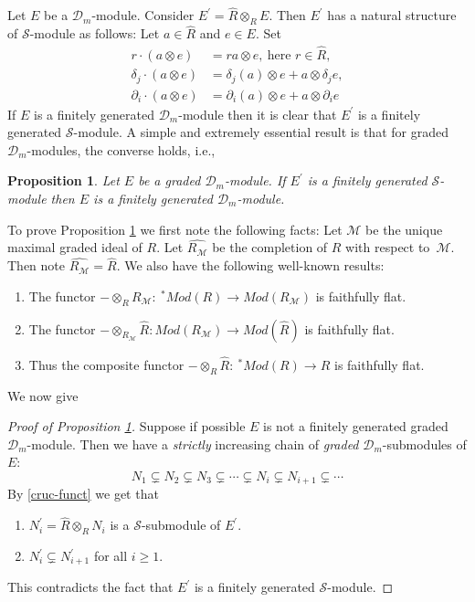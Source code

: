 \documentclass{amsart}
\newcommand{\wrt}{with respect to}
\newcommand{\D}{\mathcal{D} }
\newcommand{\M}{\mathcal{M} }
\newcommand{\Sc}{\mathcal{S} }
\newcommand{\rt}{\rightarrow}
\theoremstyle{plain}
\newtheorem{proposition}[theorem]{Proposition}
\theoremstyle{definition}
\theoremstyle{remark}
\begin{document}
 Let $E$ be a $\D_m$-module. Consider $E^\prime = \widehat{R}\otimes_R E$. Then $E^\prime$ has a natural structure of $\Sc$-module as follows:
 Let $a \in \widehat{R}$ and $e \in E$. Set
 \begin{align*}
 r \cdot (a\otimes e) &=  ra\otimes e, \ \text{here $r \in \widehat{R}$},\\
 \delta_j\cdot (a\otimes e) &=  \delta_j(a)\otimes e  + a \otimes \delta_j e, \\
  \partial_i\cdot (a\otimes e) &=  \partial_i(a)\otimes e  + a \otimes \partial_i e
 \end{align*}
 If $E$ is a finitely generated  $\D_m$-module then it is clear that $E^\prime$ is a finitely generated $\Sc$-module.
 A simple and extremely essential result is that for graded $\D_m$-modules, the converse holds, i.e.,
 \begin{proposition} \label{crucial}
 Let $E$ be a graded $\D_m$-module. If $E^\prime $ is a finitely generated $\Sc$-module then $E$ is a finitely generated $\D_m$-module.
 \end{proposition}
 \s \label{cruc-funct} To prove Proposition \ref{crucial} we first note the following facts:   Let $\M$ be the unique  maximal graded ideal of $R$. Let $\widehat{R_\M} $ be the completion of $R$ \wrt \ $\M$. Then note $\widehat{R_\M} = \widehat{R}$. We also have the following well-known results:
\begin{enumerate}
\item
The functor $-\otimes_R R_\M \colon  \ ^* Mod(R) \rt Mod(R_\M)$ is faithfully flat. 
\item
The functor
 $-\otimes_{R_\M}  \widehat{R}\colon   Mod(R_\M) \rt Mod(\widehat{R})$ is faithfully flat.
 \item
 Thus the composite functor $-\otimes_R \widehat{R} \colon  \ ^* Mod(R) \rt \widehat{R}$ is faithfully flat. 
\end{enumerate} 
 We now give
 \begin{proof}[Proof of Proposition \ref{crucial}]
 Suppose if possible $E$ is not a finitely generated graded $\D_m$-module.
 Then we have a \emph{strictly} increasing chain of \emph{graded} $\D_m$-submodules  of $E$:
 \[
 N_1 \varsubsetneq N_2 \varsubsetneq N_3 \varsubsetneq \cdots \varsubsetneq N_i \varsubsetneq N_{i+1} \varsubsetneq \cdots
 \]
 By \ref{cruc-funct} we get that
 \begin{enumerate}
 \item
 $N_i^\prime = \widehat{R}\otimes_R N_i$ is a $\Sc$-submodule of $E^\prime$.
 \item
 $N_i^\prime \varsubsetneq N_{i+1}^\prime$ for all $i \geq 1$.
 \end{enumerate}
 This contradicts the fact that $E^\prime$ is a finitely generated $\Sc$-module.
 \end{proof}
 
\end{document}
